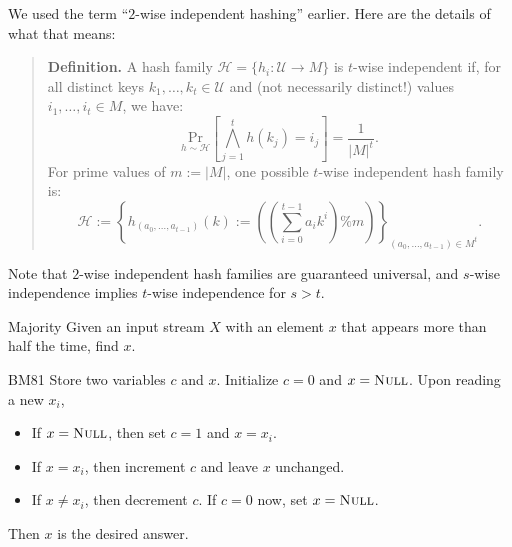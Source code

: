 \begin{remark}
    We used the term ``$2$-wise independent hashing'' earlier.  Here are the details of what that means:
    \begin{quote}
        \textbf{Definition.} A hash family $\mathcal{H} = \{h_i: \mathcal{U} \to M\}$ is $t$-wise independent if, for all distinct keys $k_1, \dots, k_t \in \mathcal{U}$ and (not necessarily distinct!) values $i_1, \dots, i_t \in M$, we have:
        \[ \underset{h \sim \mathcal{H}}{\mathrm{Pr}} \left [ \bigwedge_{j = 1}^t h(k_j) = i_j \right ] = \dfrac{1}{|M|^t}. \]
        For prime values of $m := |M|$, one possible $t$-wise independent hash family is:
        \[ \mathcal{H} := \left \{ h_{(a_0, \dots, a_{t - 1})}(k) := \left( \left(\sum_{i = 0}^{t - 1} a_i k^i\right) \% m \right) \right \}_{(a_0, \dots, a_{t - 1}) \in M^t}. \]
    \end{quote}
    Note that $2$-wise independent hash families are guaranteed universal, and $s$-wise independence implies $t$-wise independence for $s > t$.
\end{remark}

\begin{problem}{Majority}
    Given an input stream $X$ with an element $x$ that appears more than half the time, find $x$.
\end{problem}

\begin{solution}{BM81}
    Store two variables $c$ and $x$.  Initialize $c = 0$ and $x = \textsc{Null}$.  Upon reading a new $x_i$,
    \begin{itemize}
        \item If $x = \textsc{Null}$, then set $c = 1$ and $x = x_i$.
        \item If $x = x_i$, then increment $c$ and leave $x$ unchanged.
        \item If $x \neq x_i$, then decrement $c$.  If $c = 0$ now, set $x = \textsc{Null}$.
    \end{itemize}
    Then $x$ is the desired answer.
\end{solution}

